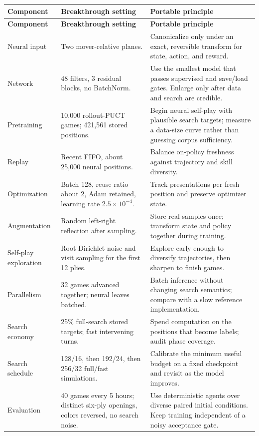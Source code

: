 \documentclass[10.5pt,letterpaper]{article}
\begin{document}
\small
\begin{longtable}{L{0.20\textwidth} L{0.25\textwidth} L{0.42\textwidth}}
\toprule
\sffamily\bfseries Component &
\sffamily\bfseries Breakthrough setting &
\sffamily\bfseries Portable principle \\
\midrule
\endfirsthead
\toprule
\sffamily\bfseries Component &
\sffamily\bfseries Breakthrough setting &
\sffamily\bfseries Portable principle \\
\midrule
\endhead
Neural input &
Two mover-relative planes. &
Canonicalize only under an exact, reversible transform for state, action, and
reward. \\
Network &
48 filters, 3 residual blocks, no BatchNorm. &
Use the smallest model that passes supervised and save/load gates. Enlarge only
after data and search are credible. \\
Pretraining &
10,000 rollout-PUCT games; 421,561 stored positions. &
Begin neural self-play with plausible search targets; measure a data-size curve
rather than guessing corpus sufficiency. \\
Replay &
Recent FIFO, about 25,000 neural positions. &
Balance on-policy freshness against trajectory and skill diversity. \\
Optimization &
Batch 128, reuse ratio about 2, Adam retained, learning rate
$2.5\times10^{-4}$. &
Track presentations per fresh position and preserve optimizer state. \\
Augmentation &
Random left-right reflection after sampling. &
Store real samples once; transform state and policy together during training. \\
Self-play exploration &
Root Dirichlet noise and visit sampling for the first 12 plies. &
Explore early enough to diversify trajectories, then sharpen to finish games. \\
Parallelism &
32 games advanced together; neural leaves batched. &
Batch inference without changing search semantics; compare with a slow
reference implementation. \\
Search economy &
25\% full-search stored targets; fast intervening turns. &
Spend computation on the positions that become labels; audit phase coverage. \\
Search schedule &
128/16, then 192/24, then 256/32 full/fast simulations. &
Calibrate the minimum useful budget on a fixed checkpoint and revisit as the
model improves. \\
Evaluation &
40 games every 5 hours; distinct six-ply openings, colors reversed, no search
noise. &
Use deterministic agents over diverse paired initial conditions. Keep training
independent of a noisy acceptance gate. \\
\bottomrule
\end{longtable}
\normalsize
\end{document}
